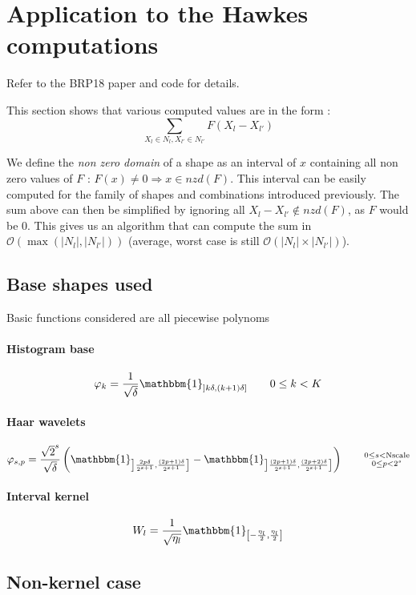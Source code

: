 \documentclass[a4paper,10pt]{article}
\begin{document}
\section{Application to the Hawkes computations}
Refer to the BRP18 paper and code for details.

This section shows that various computed values are in the form :
\[ \sum_{X_l \in N_l, X_{l'} \in N_{l'}} F(X_l-X_{l'}) \]

We define the \emph{non zero domain} of a shape as an interval of $x$ containing all non zero values of $F$ : $F(x) \ne 0 \Rightarrow x \in nzd(F)$.
This interval can be easily computed for the family of shapes and combinations introduced previously.
The sum above can then be simplified by ignoring all $X_l - X_{l'} \notin nzd(F)$, as $F$ would be $0$.
This gives us an algorithm that can compute the sum in $\mathcal{O}(\max(|N_l|, |N_{l'}|))$ (average, worst case is still $\mathcal{O}(|N_l| \times |N_{l'}|)$).

\subsection{Base shapes used}
Basic functions considered are all piecewise polynoms

\paragraph{Histogram base}
\[ \varphi_k = \frac{1}{\sqrt{\delta}} \mathbbm{1}_{\left] k\delta, (k+1)\delta \right]} \qquad 0 \le k < K \]

\paragraph{Haar wavelets}
\[ \varphi_{s,p} = \frac{\sqrt{2}^s}{\sqrt{\delta}} \left(
    \mathbbm{1}_{ \left] \frac{2p \delta}{2^{s+1}}, \frac{(2p+1) \delta}{2^{s+1}} \right] } -
    \mathbbm{1}_{ \left] \frac{(2p +1) \delta}{2^{s+1}}, \frac{(2p + 2) \delta}{2^{s+1}} \right] }
\right) \qquad \substack{0 \le s < \text{Nscale} \\ 0 \le p < 2^s} \]

\paragraph{Interval kernel}
\[ W_l = \frac{1}{\sqrt{\eta_l}} \mathbbm{1}_{\left[ -\frac{\eta_l}{2}, \frac{\eta_l}{2} \right]} \]

\subsection{Non-kernel case}
\end{document}
